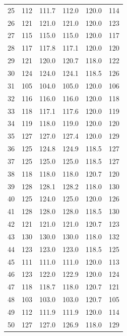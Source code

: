 \documentclass[12pt,oneside]{report}
\begin{document}
\begin{singlespace}
\begin{longtable}{@{}rrrrrr@{}}
25 & 112 & 111.7 & 112.0 & 120.0 & 114\\
26 & 121 & 121.0 & 121.0 & 120.0 & 123\\
27 & 115 & 115.0 & 115.0 & 120.0 & 117\\
28 & 117 & 117.8 & 117.1 & 120.0 & 120\\
29 & 121 & 120.0 & 120.7 & 118.0 & 122\\
30 & 124 & 124.0 & 124.1 & 118.5 & 126\\
31 & 105 & 104.0 & 105.0 & 120.0 & 106\\
32 & 116 & 116.0 & 116.0 & 120.0 & 118\\
33 & 118 & 117.1 & 117.6 & 120.0 & 119\\
34 & 119 & 118.0 & 119.0 & 120.0 & 120\\
35 & 127 & 127.0 & 127.4 & 120.0 & 129\\
36 & 125 & 124.8 & 124.9 & 118.5 & 127\\
37 & 125 & 125.0 & 125.0 & 118.5 & 127\\
38 & 118 & 118.0 & 118.0 & 120.7 & 120\\
39 & 128 & 128.1 & 128.2 & 118.0 & 130\\
40 & 125 & 124.0 & 125.0 & 120.0 & 126\\
41 & 128 & 128.0 & 128.0 & 118.5 & 130\\
42 & 121 & 121.0 & 121.0 & 120.7 & 123\\
43 & 130 & 130.0 & 130.0 & 118.0 & 132\\
44 & 123 & 123.0 & 123.0 & 118.5 & 125\\
45 & 111 & 111.0 & 111.0 & 120.0 & 113\\
46 & 123 & 122.0 & 122.9 & 120.0 & 124\\
47 & 118 & 118.7 & 118.0 & 120.7 & 121\\
48 & 103 & 103.0 & 103.0 & 120.7 & 105\\
49 & 112 & 111.9 & 111.9 & 120.0 & 114\\
50 & 127 & 127.0 & 126.9 & 118.0 & 129\\
\bottomrule
\end{longtable}
\end{singlespace}
\end{document}
